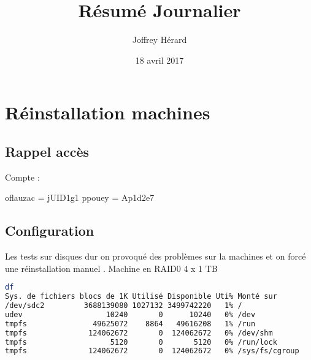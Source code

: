 \documentclass[french]{article}
\begin{document}
\title{Résumé Journalier}
\author{Joffrey Hérard}
\date{18 avril 2017} 

\maketitle
\section{Réinstallation machines}
\subsection{Rappel accès}
Compte : 

oflauzac = jUID1g1 \newline
ppouey = Ap1d2e7

\subsection{Configuration }
Les tests sur disques dur on provoqué des problèmes sur la machines et on forcé une réinstallation manuel .
Machine en RAID0 
4 x 1 TB
\begin{lstlisting}[language=bash,caption={df}]
df
Sys. de fichiers blocs de 1K Utilisé Disponible Uti% Monté sur
/dev/sdc2         3688139080 1027132 3499742220   1% /
udev                   10240       0      10240   0% /dev
tmpfs               49625072    8864   49616208   1% /run
tmpfs              124062672       0  124062672   0% /dev/shm
tmpfs                   5120       0       5120   0% /run/lock
tmpfs              124062672       0  124062672   0% /sys/fs/cgroup

\end{lstlisting}
\newpage
\end{document}

